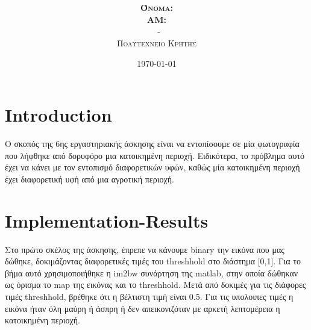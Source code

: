 \documentclass{article}
\title{\underline{\textbf{\assignmentNumber}}}
\author{\textsc{\textbf{Όνομα:}}  \studentName\\
		\textsc{\textbf{ΑΜ:}}  \studentNumber\\
		\course \ - \courseName\\ 
		\textsc{Πολυτεχνείο Κρήτης}
}
\date{\today}
\begin{document}
	\maketitle

\section*{Introduction}
	Ο σκοπός της 6ης εργαστηριακής άσκησης είναι να εντοπίσουμε σε μία φωτογραφία που λήφθηκε από δορυφόρο μια κατοικημένη περιοχή. Ειδικότερα, το πρόβλημα αυτό έχει να κάνει με τον εντοπισμό διαφορετικών υφών, καθώς μία κατοικημένη περιοχή έχει διαφορετική υφή από μια αγροτική περιοχή.
	
\section*{Implementation-Results}
	Στο πρώτο σκέλος της άσκησης, έπρεπε να κάνουμε binary την εικόνα που μας δώθηκε, δοκιμάζοντας διαφορετικές τιμές του threshhold στο διάστημα [0,1]. Για το βήμα αυτό χρησιμοποιήθηκε η im2bw συνάρτηση της matlab, στην οποία δώθηκαν ως όρισμα το map της εικόνας και το threshhold. Μετά από δοκιμές για τις διάφορες τιμές threshhold, βρέθηκε ότι η βέλτιστη τιμή είναι 0.5. Για τις υπολοιπες τιμές η εικόνα ήταν όλη μαύρη ή άσπρη ή δεν απεικονιζόταν με αρκετή λεπτομέρεια η κατοικημένη περιοχή.
	 
\end{document}
